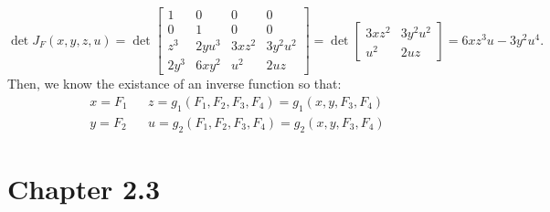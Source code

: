 \documentclass[11pt]{article}
\begin{document}
\[\det J_F(x, y, z, u) = \det \begin{bmatrix} 1 & 0 & 0 & 0 \\ 0 & 1 & 0 & 0 \\ z^3 & 2yu^3 & 3xz^2 & 3y^2u^2 \\ 2y^3 & 6xy^2 & u^2 & 2uz \end{bmatrix} = \det \begin{bmatrix} 3xz^2 & 3y^2u^2 \\ u^2 & 2uz \end{bmatrix} = 6xz^3u - 3y^2u^4.\]
Then, we know the existance of an inverse function so that:
\begin{align*}
    x = F_1 & & z = g_1(F_1, F_2, F_3, F_4) = g_1(x, y, F_3, F_4) \\ 
    y = F_2 & & u = g_2(F_1, F_2, F_3, F_4) = g_2(x, y, F_3, F_4)
\end{align*}
\pagebreak
\section*{Chapter 2.3}
\end{document}
